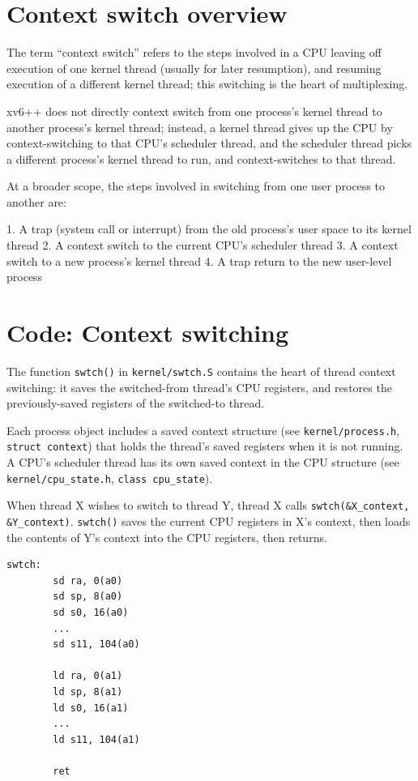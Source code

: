 \section{Context switch overview}

The term ``context switch'' refers to the steps involved in a CPU
leaving off execution of one kernel thread (usually for later
resumption), and resuming execution of a different kernel thread; this
switching is the heart of multiplexing.

xv6++ does not directly context
switch from one process's kernel thread to another process's kernel
thread; instead, a kernel thread gives up the CPU by context-switching
to that CPU's scheduler thread, and the scheduler thread picks a
different process's kernel thread to run, and context-switches to that
thread.

At a broader scope, the steps involved in switching from one user
process to another are:

1. A trap (system call or interrupt) from the old process's user space to its kernel thread  
2. A context switch to the current CPU's scheduler thread  
3. A context switch to a new process's kernel thread  
4. A trap return to the new user-level process  

\section{Code: Context switching}

The function \texttt{swtch()} in \texttt{kernel/swtch.S} contains the heart
of thread context switching: it saves the switched-from thread's CPU
registers, and restores the previously-saved registers of the
switched-to thread.

Each process object includes a saved context structure
(see \texttt{kernel/process.h}, \texttt{struct context})
that holds the thread's saved registers when it is not running.
A CPU's scheduler thread has its own saved context in the CPU structure
(see \texttt{kernel/cpu\_state.h}, \texttt{class cpu\_state}).

When thread X wishes to switch to thread Y, thread X
calls \texttt{swtch(\&X\_context, \&Y\_context)}.
\texttt{swtch()}
saves the current CPU registers in X's context, then loads the contents
of Y's context into the CPU registers, then returns.

\begin{verbatim}
swtch:
        sd ra, 0(a0)
        sd sp, 8(a0)
        sd s0, 16(a0)
        ...
        sd s11, 104(a0)

        ld ra, 0(a1)
        ld sp, 8(a1)
        ld s0, 16(a1)
        ...
        ld s11, 104(a1)

        ret
\end{verbatim}

